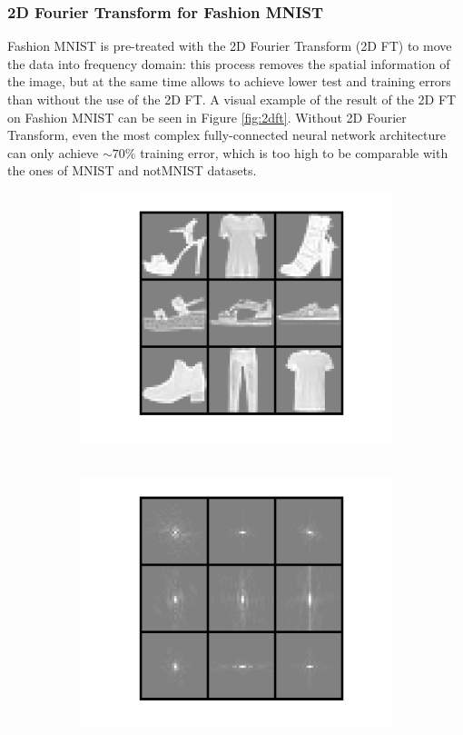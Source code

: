 \documentclass[letterpaper,12pt]{article}
\begin{document}
\subsubsection*{2D Fourier Transform for Fashion MNIST}
Fashion MNIST is pre-treated with the 2D Fourier Transform (2D FT) to move the data into frequency domain: this process removes the spatial information of the image, but at the same time allows to achieve lower test and training errors than without the use of the 2D FT. A visual example of the result of the 2D FT on Fashion MNIST can be seen in Figure \ref{fig:2dft}. Without 2D Fourier Transform, even the most complex fully-connected neural network architecture can only achieve $\sim 70\%$ training error, which is too high to be comparable with the ones of MNIST and notMNIST datasets.

\begin{figure}[!ht]
\centering
\vspace{1em}
\begin{subfigure}{.35\textwidth}
  \centering
  \includegraphics[width=\linewidth]{fashion_raw}
  \caption{~}
\end{subfigure}
\begin{subfigure}{.35\textwidth}
  \centering
  \includegraphics[width=\linewidth]{fashion_ft2}

\end{subfigure}
\end{figure}
\end{document}
